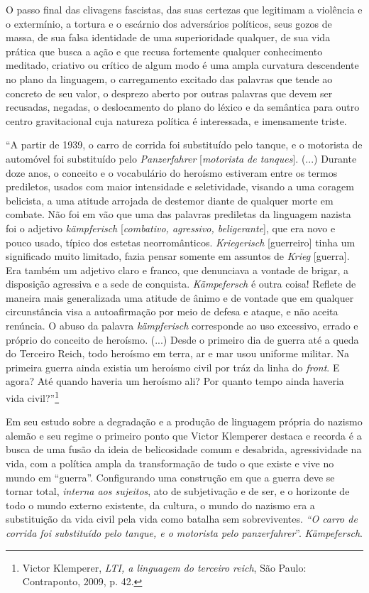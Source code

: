 O passo final das clivagens fascistas, das suas certezas que legitimam a
violência e o extermínio, a tortura e o escárnio dos adversários
políticos, seus gozos de massa, de sua falsa identidade de uma
superioridade qualquer, de sua vida prática que busca a ação e que
recusa fortemente qualquer conhecimento meditado, criativo ou crítico de
algum modo é uma ampla curvatura descendente no plano da linguagem, o
carregamento excitado das palavras que tende ao concreto de seu valor, o
desprezo aberto por outras palavras que devem ser recusadas, negadas, o
deslocamento do plano do léxico e da semântica para outro centro
gravitacional cuja natureza política é interessada, e imensamente
triste.

``A partir de 1939, o carro de corrida foi substituído pelo tanque, e o
motorista de automóvel foi substituído pelo \emph{Panzerfahrer}
{[}\emph{motorista de tanques}{]}. (...) Durante doze anos, o conceito e
o vocabulário do heroísmo estiveram entre os termos prediletos, usados
com maior intensidade e seletividade, visando a uma coragem belicista, a
uma atitude arrojada de destemor diante de qualquer morte em combate.
Não foi em vão que uma das palavras prediletas da linguagem nazista foi
o adjetivo \emph{kämpferisch} {[}\emph{combativo, agressivo,
beligerante}{]}, que era novo e pouco usado, típico dos estetas
neorromânticos. \emph{Kriegerisch} {[}guerreiro{]} tinha um significado
muito limitado, fazia pensar somente em assuntos de \emph{Krieg}
{[}guerra{]}. Era também um adjetivo claro e franco, que denunciava a
vontade de brigar, a disposição agressiva e a sede de conquista.
\emph{Kämpefersch} é outra coisa! Reflete de maneira mais generalizada
uma atitude de ânimo e de vontade que em qualquer circunstância visa a
autoafirmação por meio de defesa e ataque, e não aceita renúncia. O
abuso da palavra \emph{kämpferisch} corresponde ao uso excessivo, errado
e próprio do conceito de heroísmo. (...) Desde o primeiro dia de guerra
até a queda do Terceiro Reich, todo heroísmo em terra, ar e mar usou
uniforme militar. Na primeira guerra ainda existia um heroísmo civil por
tráz da linha do \emph{front}. E agora? Até quando haveria um heroísmo
ali? Por quanto tempo ainda haveria vida civil?''\footnote{Victor
  Klemperer, \emph{LTI, a linguagem do terceiro reich}, São Paulo:
  Contraponto, 2009, p. 42.}

Em seu estudo sobre a degradação e a produção de linguagem própria do
nazismo alemão e seu regime o primeiro ponto que Victor Klemperer
destaca e recorda é a busca de uma fusão da ideia de belicosidade comum
e desabrida, agressividade na vida, com a política ampla da
transformação de tudo o que existe e vive no mundo em ``guerra''.
Configurando uma construção em que a guerra deve se tornar total,
\emph{interna aos sujeitos}, ato de subjetivação e de ser, e o horizonte
de todo o mundo externo existente, da cultura, o mundo do nazismo era a
substituição da vida civil pela vida como batalha sem sobreviventes.
\emph{``O carro de corrida foi substituído pelo tanque, e o motorista
pelo panzerfahrer}''. \emph{Kämpefersch}.

